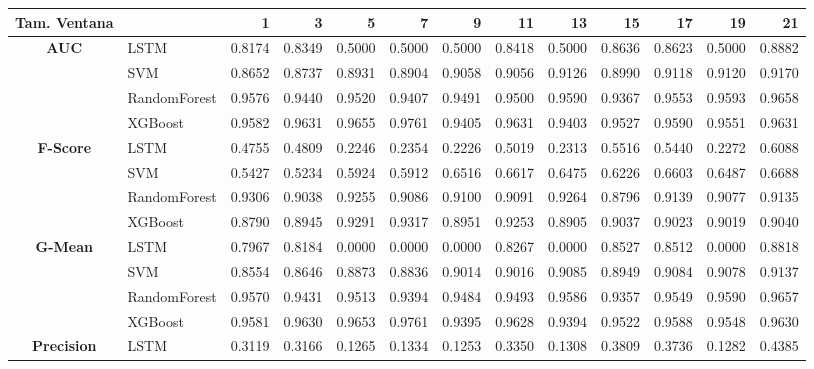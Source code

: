 \begin{table}[h]
	\centering
	\begin{adjustbox}{max width=15cm}
		\begin{tabular}{|c|l|r|r|r|r|r|r|r|r|r|r|r|}
			\hline
			\textbf{Tam. Ventana}&         &      1  &      3  &      5  &      7  &      9  &      11 &      13 &      15 &      17 &      19 &      21 \\
			\hline
			\textbf{AUC} & LSTM &  0.8174 &  0.8349 &  0.5000 &  0.5000 &  0.5000 &  0.8418 &  0.5000 &  0.8636 &  0.8623 &  0.5000 &  0.8882 \\
			& SVM &  0.8652 &  0.8737 &  0.8931 &  0.8904 &  0.9058 &  0.9056 &  0.9126 &  0.8990 &  0.9118 &  0.9120 &  0.9170 \\
			& RandomForest &  0.9576 &  0.9440 &  0.9520 &  0.9407 &  0.9491 &  0.9500 &  0.9590 &  0.9367 &  0.9553 &  0.9593 &  0.9658 \\
			& XGBoost &  0.9582 &  0.9631 &  0.9655 &  0.9761 &  0.9405 &  0.9631 &  0.9403 &  0.9527 &  0.9590 &  0.9551 &  0.9631 \\
			\hline
			\textbf{F-Score} & LSTM &  0.4755 &  0.4809 &  0.2246 &  0.2354 &  0.2226 &  0.5019 &  0.2313 &  0.5516 &  0.5440 &  0.2272 &  0.6088 \\
			& SVM &  0.5427 &  0.5234 &  0.5924 &  0.5912 &  0.6516 &  0.6617 &  0.6475 &  0.6226 &  0.6603 &  0.6487 &  0.6688 \\
			& RandomForest &  0.9306 &  0.9038 &  0.9255 &  0.9086 &  0.9100 &  0.9091 &  0.9264 &  0.8796 &  0.9139 &  0.9077 &  0.9135 \\
			& XGBoost &  0.8790 &  0.8945 &  0.9291 &  0.9317 &  0.8951 &  0.9253 &  0.8905 &  0.9037 &  0.9023 &  0.9019 &  0.9040 \\
			\hline
			\textbf{G-Mean} & LSTM &  0.7967 &  0.8184 &  0.0000 &  0.0000 &  0.0000 &  0.8267 &  0.0000 &  0.8527 &  0.8512 &  0.0000 &  0.8818 \\
			& SVM &  0.8554 &  0.8646 &  0.8873 &  0.8836 &  0.9014 &  0.9016 &  0.9085 &  0.8949 &  0.9084 &  0.9078 &  0.9137 \\
			& RandomForest &  0.9570 &  0.9431 &  0.9513 &  0.9394 &  0.9484 &  0.9493 &  0.9586 &  0.9357 &  0.9549 &  0.9590 &  0.9657 \\
			& XGBoost &  0.9581 &  0.9630 &  0.9653 &  0.9761 &  0.9395 &  0.9628 &  0.9394 &  0.9522 &  0.9588 &  0.9548 &  0.9630 \\
			\hline
			\textbf{Precision} & LSTM &  0.3119 &  0.3166 &  0.1265 &  0.1334 &  0.1253 &  0.3350 &  0.1308 &  0.3809 &  0.3736 &  0.1282 &  0.4385 \\

\end{tabular}
\end{adjustbox}
\end{table}
